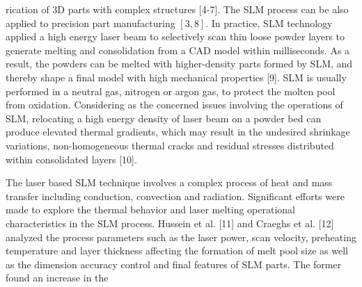 \documentclass[10pt]{article}
\begin{document}
rication of 3D parts with complex structures [4-7]. The SLM process can be also applied to precision part manufacturing $[3,8]$. In practice, SLM technology applied a high energy laser beam to selectively scan thin loose powder layers to generate melting and consolidation from a CAD model within milliseconds. As a result, the powders can be melted with higher-density parts formed by SLM, and thereby shape a final model with high mechanical properties [9]. SLM is usually performed in a neutral gas, nitrogen or argon gas, to protect the molten pool from oxidation. Considering as the concerned issues involving the operations of SLM, relocating a high energy density of laser beam on a powder bed can produce elevated thermal gradients, which may result in the undesired shrinkage variations, non-homogeneous thermal cracks and residual stresses distributed within consolidated layers [10].

The laser based SLM technique involves a complex process of heat and mass transfer including conduction, convection and radiation. Significant efforts were made to explore the thermal behavior and laser melting operational characteristics in the SLM process. Hussein et al. [11] and Craeghs et al. [12] analyzed the process parameters such as the laser power, scan velocity, preheating temperature and layer thickness affecting the formation of melt pool size as well as the dimension accuracy control and final features of SLM parts. The former found an increase in the
\end{document}
